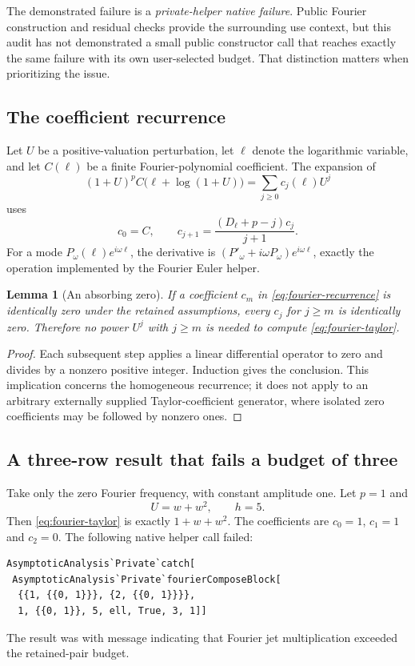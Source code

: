 \documentclass[11pt,a4paper]{article}
\newcommand{\code}[1]{\texttt{\detokenize{#1}}}
\newtheorem{lemma}[proposition]{Lemma}
\begin{document}
The demonstrated failure is a \emph{private-helper native failure}. Public Fourier construction and residual checks provide the surrounding use context, but this audit has not demonstrated a small public constructor call that reaches exactly the same failure with its own user-selected budget. That distinction matters when prioritizing the issue.

\subsection{The coefficient recurrence}
Let $U$ be a positive-valuation perturbation, let $\ell$ denote the logarithmic variable, and let $C(\ell)$ be a finite Fourier-polynomial coefficient. The expansion of
\begin{equation}
 (1+U)^p C\bigl(\ell+\log(1+U)\bigr)
 =\sum_{j\ge0}c_j(\ell)U^j
 \label{eq:fourier-taylor}
\end{equation}
uses
\begin{equation}
 c_0=C,\qquad
 c_{j+1}=\frac{(D_\ell+p-j)c_j}{j+1}.
 \label{eq:fourier-recurrence}
\end{equation}
For a mode $P_\omega(\ell)e^{i\omega\ell}$, the derivative is
$(P'_\omega+i\omega P_\omega)e^{i\omega\ell}$, exactly the operation implemented by the Fourier Euler helper.\cite{fourier-source}

\begin{lemma}[An absorbing zero]
If a coefficient $c_m$ in \eqref{eq:fourier-recurrence} is identically zero under the retained assumptions, every $c_j$ for $j\ge m$ is identically zero. Therefore no power $U^j$ with $j\ge m$ is needed to compute \eqref{eq:fourier-taylor}.
\end{lemma}
\begin{proof}
Each subsequent step applies a linear differential operator to zero and divides by a nonzero positive integer. Induction gives the conclusion. This implication concerns the homogeneous recurrence; it does not apply to an arbitrary externally supplied Taylor-coefficient generator, where isolated zero coefficients may be followed by nonzero ones.
\end{proof}

\subsection{A three-row result that fails a budget of three}
Take only the zero Fourier frequency, with constant amplitude one. Let $p=1$ and
\[
 U=w+w^2,\qquad h=5.
\]
Then \eqref{eq:fourier-taylor} is exactly $1+w+w^2$. The coefficients are $c_0=1$, $c_1=1$ and $c_2=0$. The following native helper call failed:
\begin{lstlisting}
AsymptoticAnalysis`Private`catch[
 AsymptoticAnalysis`Private`fourierComposeBlock[
  {{1, {{0, 1}}}, {2, {{0, 1}}}},
  1, {{0, 1}}, 5, ell, True, 3, 1]]
\end{lstlisting}
The result was \code{Failure["ResourceLimit", ...]} with message indicating that Fourier jet multiplication exceeded the retained-pair budget.
\end{document}
